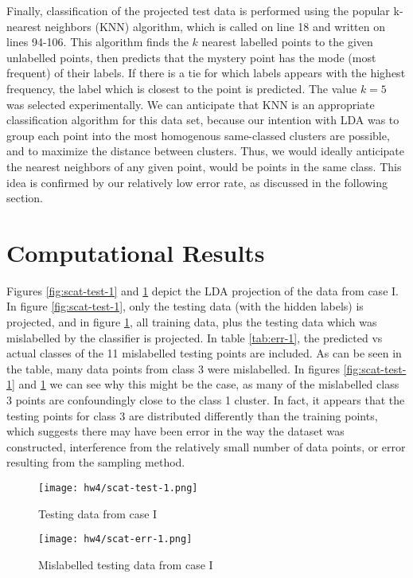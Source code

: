 \documentclass[a4paper,10 pt]{article}
\begin{document}
Finally, classification of the projected test data is performed using the popular k-nearest neighbors (KNN) algorithm, which is called on line 18 and written on lines 94-106. This algorithm finds the $k$ nearest labelled points to the given unlabelled points, then predicts that the mystery point has the mode (most frequent) of their labels. If there is a tie for which labels appears with the highest frequency, the label which is closest to the point is predicted. The value $k=5$ was selected experimentally. We can anticipate that KNN is an appropriate classification algorithm for this data set, because our intention with LDA was to group each point into the most homogenous same-classed clusters are possible, and to maximize the distance between clusters. Thus, we would ideally anticipate the nearest neighbors of any given point, would be points in the same class. This idea is confirmed by our relatively low error rate, as discussed in the following section.




\section{Computational Results}

Figures \ref{fig:scat-test-1} and \ref{fig:scat-err-1} depict the LDA projection of the data from case I. In figure \ref{fig:scat-test-1}, only the testing data (with the hidden labels) is projected, and in figure \ref{fig:scat-err-1}, all training data, plus the testing data which was mislabelled by the classifier is projected. In table \ref{tab:err-1}, the predicted vs actual classes of the 11 mislabelled testing points are included. As can be seen in the table, many data points from class 3 were mislabelled. In figures \ref{fig:scat-test-1} and \ref{fig:scat-err-1} we can see why this might be the case, as many of the mislabelled class 3 points are confoundingly close to the class 1 cluster. In fact, it appears that the testing points for class 3 are distributed differently than the training points, which suggests there may have been error in the way the dataset was constructed, interference from the relatively small number of data points, or error resulting from the sampling method.


\begin{figure}
    \centering
    \begin{minipage}{0.45\textwidth}
        \centering
        \texttt{[image: hw4/scat-test-1.png]} %
        \caption{Testing data from case I}
        \label{fig:scat-test-1}
    \end{minipage}\hfill
    \begin{minipage}{0.45\textwidth}
        \centering
        \texttt{[image: hw4/scat-err-1.png]} %
        \caption{Mislabelled testing data from case I}
        \label{fig:scat-err-1}
    \end{minipage}
\end{figure}
\end{document}
